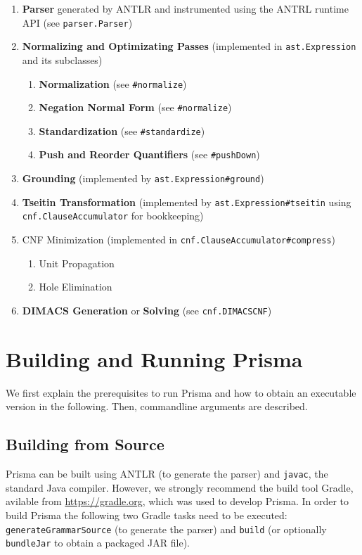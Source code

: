 \documentclass{llncs}
\begin{document}
\begin{enumerate}
	\item{\textbf{Parser} generated by ANTLR and instrumented using the ANTRL runtime API (see \texttt{parser.Parser})}
	\item{\textbf{Normalizing and Optimizating Passes} (implemented in \texttt{ast.Expression} and its subclasses)
		\begin{enumerate}
			\item{\textbf{Normalization} (see \texttt{\#normalize})}
			\item{\textbf{Negation Normal Form} (see \texttt{\#normalize})}
			\item{\textbf{Standardization} (see \texttt{\#standardize})}
			\item{\textbf{Push and Reorder Quantifiers} (see \texttt{\#pushDown})}
		\end{enumerate}
	}
	\item{\textbf{Grounding} (implemented by \texttt{ast.Expression\#ground})}
	\item{\textbf{Tseitin Transformation} (implemented by \texttt{ast.Expression\#tseitin} using \texttt{cnf.ClauseAccumulator} for bookkeeping)}
	\item{CNF Minimization (implemented in \texttt{cnf.ClauseAccumulator\#compress})
		\begin{enumerate}
			\item{Unit Propagation}
			\item{Hole Elimination}
		\end{enumerate}
	}
	\item{\textbf{DIMACS Generation} or \textbf{Solving} (see \texttt{cnf.DIMACSCNF})}
\end{enumerate}

\section{Building and Running Prisma}

We first explain the prerequisites to run Prisma and how to obtain an executable version in the following. Then, commandline arguments are described.

\subsection{Building from Source}

Prisma can be built using ANTLR (to generate the parser) and \texttt{javac}, the standard Java compiler. However, we strongly recommend the build tool Gradle, avilable from \url{https://gradle.org}, which was used to develop Prisma. In order to build Prisma the following two Gradle tasks need to be executed: \texttt{generateGrammarSource} (to generate the parser) and \texttt{build} (or optionally \texttt{bundleJar} to obtain a packaged JAR file).
\end{document}
